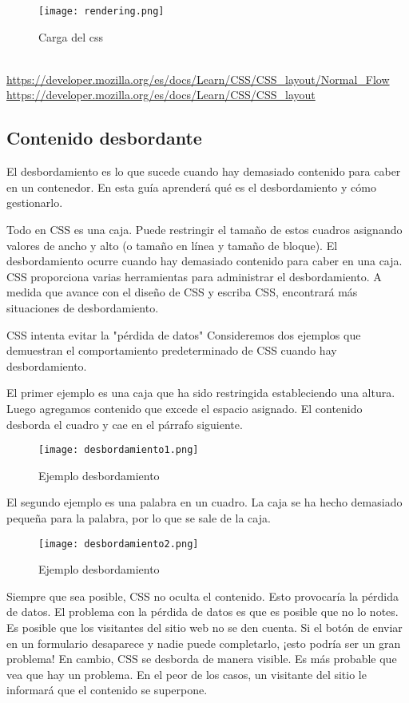 \begin{figure}[H]
	\center
	\texttt{[image: rendering.png]}
	\caption{Carga del css}
	\label{fig:super}
\end{figure}


\\
\url{https://developer.mozilla.org/es/docs/Learn/CSS/CSS_layout/Normal_Flow}
\url{https://developer.mozilla.org/es/docs/Learn/CSS/CSS_layout}

\subsection{Contenido desbordante}


El desbordamiento es lo que sucede cuando hay demasiado contenido para caber en un contenedor. En esta guía aprenderá qué es el desbordamiento y cómo gestionarlo.

Todo en CSS es una caja. Puede restringir el tamaño de estos cuadros asignando valores de ancho y alto (o tamaño en línea y tamaño de bloque). El desbordamiento ocurre cuando hay demasiado contenido para caber en una caja. CSS proporciona varias herramientas para administrar el desbordamiento. A medida que avance con el diseño de CSS y escriba CSS, encontrará más situaciones de desbordamiento.

CSS intenta evitar la "pérdida de datos"
Consideremos dos ejemplos que demuestran el comportamiento predeterminado de CSS cuando hay desbordamiento.

El primer ejemplo es una caja que ha sido restringida estableciendo una altura. Luego agregamos contenido que excede el espacio asignado. El contenido desborda el cuadro y cae en el párrafo siguiente.


\begin{figure}[H]
	\center
	\texttt{[image: desbordamiento1.png]}
	\caption{Ejemplo desbordamiento}
	\label{fig:super}
\end{figure}

El segundo ejemplo es una palabra en un cuadro. La caja se ha hecho demasiado pequeña para la palabra, por lo que se sale de la caja.

\begin{figure}[H]
	\center
	\texttt{[image: desbordamiento2.png]}
	\caption{Ejemplo desbordamiento}
	\label{fig:super}
\end{figure}

Siempre que sea posible, CSS no oculta el contenido. Esto provocaría la pérdida de datos. El problema con la pérdida de datos es que es posible que no lo notes. Es posible que los visitantes del sitio web no se den cuenta. Si el botón de enviar en un formulario desaparece y nadie puede completarlo, ¡esto podría ser un gran problema! En cambio, CSS se desborda de manera visible. Es más probable que vea que hay un problema. En el peor de los casos, un visitante del sitio le informará que el contenido se superpone.

